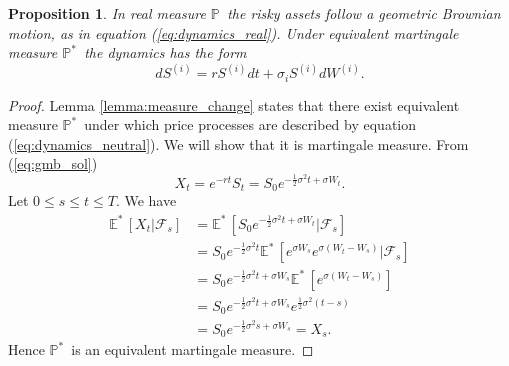 \documentclass[a4paper,11pt, twoside]{book}
\newtheorem{prop}[thm]{Proposition}
\theoremstyle{definition}
\theoremstyle{remark}
\def\P{{\mathbb{P}}\,}
\def\Em{{\mathbb{E}^*}\,}
\def\Pm{{\mathbb{P}}^*\,}
\begin{document}
\begin{prop}
\label{prop:rn-dynamics}
 In real measure $\P$ the risky assets follow a geometric Brownian motion, as in equation (\ref{eq:dynamics_real}). Under equivalent martingale measure $\Pm$ the dynamics has the form
 \begin{equation}
  \label{eq:dynamics_neutral}
  dS^{(i)} = r S^{(i)} dt + \sigma_i S^{(i)} dW^{(i)}.
 \end{equation}
\end{prop}
\begin{proof}
 Lemma \ref{lemma:measure_change} states that there exist equivalent measure $\Pm$ under which price processes are described by equation (\ref{eq:dynamics_neutral}). We will show that it is martingale measure.
 From (\ref{eq:gmb_sol})
 \[ X_t = e^{-rt} S_t = S_0 e^{ -\frac{1}{2}\sigma^2 t + \sigma W_t }. \]
 Let $0 \leq s \leq t \leq T$. We have
 \begin{equation*}
  \begin{split}
   \Em[X_t | \mathcal{F}_s] &= \Em[ S_0 e^{ -\frac{1}{2}\sigma^2 t + \sigma W_t } | \mathcal{F}_s] \\
       &= S_0 e^{-\frac{1}{2}\sigma^2 t} \Em[ e^{  \sigma W_s} e^{ \sigma (W_t - W_s) } | \mathcal{F}_s] \\
       &= S_0 e^{-\frac{1}{2}\sigma^2 t + \sigma W_s} \Em[ e^{ \sigma (W_t - W_s) }] \\
       &= S_0 e^{-\frac{1}{2}\sigma^2 t + \sigma W_s}  e^{ \frac{1}{2}\sigma^2(t-s) } \\
       &= S_0 e^{-\frac{1}{2}\sigma^2 s + \sigma W_s} = X_s.
  \end{split}
 \end{equation*}
Hence $\Pm$ is an equivalent martingale measure.
\end{proof}
\end{document}
